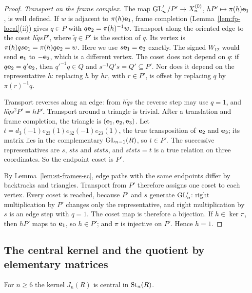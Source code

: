 \begin{proof}
\emph{Transport on the frame complex.} The map $\operatorname{GL}'_n/P'\to X_n^{(0)}$, $hP'\mapsto\pi(h)\mathbf e_1$, is well defined. If
$w$ is adjacent to $\pi(h)\mathbf e_1$, frame completion (Lemma~\ref{lem:fp-local}(ii)) gives $q\in P$ with
$q\mathbf e_2=\pi(h)^{-1}w$. Transport along the oriented edge to the coset $h\tilde q sP'$, where $\tilde q\in P'$ is the
section of $q$. Its vertex is $\pi(h)qs\mathbf e_1=\pi(h)q\mathbf e_2=w$. Here we use $s\mathbf e_1=\mathbf e_2$ exactly. The signed
$W_{12}$ would send $\mathbf e_1$ to $-\mathbf e_2$, which is a different vertex. The coset does not depend on $q$: if
$q\mathbf e_2=q'\mathbf e_2$, then $q'^{-1}q\in Q$ and $s^{-1}Q's=Q'\subseteq P'$. Nor does it depend on the representative
$h$: replacing $h$ by $hr$, with $r\in P'$, is offset by replacing $q$ by $\pi(r)^{-1}q$.

Transport reverses along an edge: from $h\tilde qs$ the reverse step may use $q=1$, and $h\tilde qs^2P'=hP'$.
Transport around a triangle is trivial. After a translation and frame completion, the triangle is
$(\mathbf e_1,\mathbf e_2,\mathbf e_3)$. Let $t=d_3(-1)e_{23}(1)e_{32}(-1)e_{23}(1)$, the true transposition of $\mathbf e_2$ and
$\mathbf e_3$; its matrix lies in the complementary $\operatorname{GL}_{n-1}(R)$, so $t\in P'$. The successive representatives are $s$,
$sts$ and $ststs$, and $ststs=t$ is a true relation on three coordinates. So the endpoint coset is $P'$.

By Lemma~\ref{lem:st-frames-sc}, edge paths with the same endpoints differ by backtracks and triangles. Transport from
$P'$ therefore assigns one coset to each vertex. Every coset is reached, because $P'$ and $s$ generate $\operatorname{GL}'_n$:
right multiplication by $P'$ changes only the representative, and right multiplication by $s$ is an edge step with
$q=1$. The coset map is therefore a bijection. If $h\in\ker\pi$, then $hP'$ maps to $\mathbf e_1$, so $h\in P'$; and $\pi$
is injective on $P'$. Hence $h=1$.
\end{proof}

\subsection{The central kernel and the quotient by elementary matrices}

\begin{proposition}\label{prop:centrality}
For $n\geq6$ the kernel $J_n(R)$ is central in $\operatorname{St}_n(R)$.
\end{proposition}

